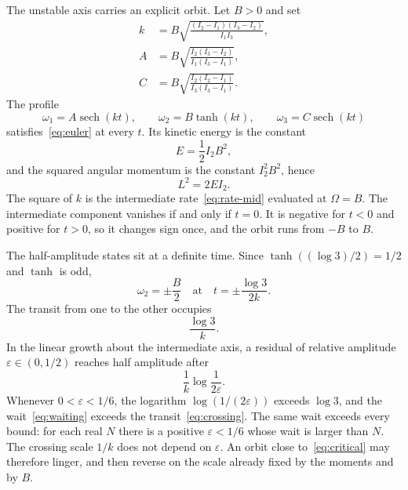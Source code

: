 \documentclass[a4paper]{article}
\begin{document}
The unstable axis carries an explicit orbit. Let \(B>0\) and set
\begin{equation}
\label{eq:amplitudes}
\begin{aligned}
k&=B\sqrt{\frac{(I_2-I_1)(I_3-I_2)}{I_1 I_3}},\\[4pt]
A&=B\sqrt{\frac{I_2(I_3-I_2)}{I_1(I_3-I_1)}},\\[4pt]
C&=B\sqrt{\frac{I_2(I_2-I_1)}{I_3(I_3-I_1)}}.
\end{aligned}
\end{equation}
The profile
\begin{equation}
\label{eq:separatrix}
\omega_1=A\operatorname{sech}(kt),\qquad
\omega_2=B\tanh(kt),\qquad
\omega_3=C\operatorname{sech}(kt)
\end{equation}
satisfies~\eqref{eq:euler} at every \(t\). Its kinetic energy is the constant
\begin{equation}
\label{eq:energy}
E=\frac12 I_2 B^2,
\end{equation}
and the squared angular momentum is the constant \(I_2^2 B^2\), hence
\begin{equation}
\label{eq:critical}
L^2=2EI_2.
\end{equation}
The square of \(k\) is the intermediate rate~\eqref{eq:rate-mid} evaluated at \(\Omega=B\). The intermediate component vanishes if and only if \(t=0\). It is negative for \(t<0\) and positive for \(t>0\), so it changes sign once, and the orbit runs from \(-B\) to \(B\).

The half-amplitude states sit at a definite time. Since \(\tanh((\log 3)/2)=1/2\) and \(\tanh\) is odd,
\[
\omega_2=\pm\frac B2
\quad\text{at}\quad
t=\pm\frac{\log 3}{2k}.
\]
The transit from one to the other occupies
\begin{equation}
\label{eq:crossing}
\frac{\log 3}{k}.
\end{equation}
In the linear growth about the intermediate axis, a residual of relative amplitude \(\varepsilon\in(0,1/2)\) reaches half amplitude after
\begin{equation}
\label{eq:waiting}
\frac1k\log\frac{1}{2\varepsilon}.
\end{equation}
Whenever \(0<\varepsilon<1/6\), the logarithm \(\log(1/(2\varepsilon))\) exceeds \(\log 3\), and the wait~\eqref{eq:waiting} exceeds the transit~\eqref{eq:crossing}. The same wait exceeds every bound: for each real \(N\) there is a positive \(\varepsilon<1/6\) whose wait is larger than \(N\). The crossing scale \(1/k\) does not depend on \(\varepsilon\). An orbit close to~\eqref{eq:critical} may therefore linger, and then reverse on the scale already fixed by the moments and by \(B\).
\end{document}
